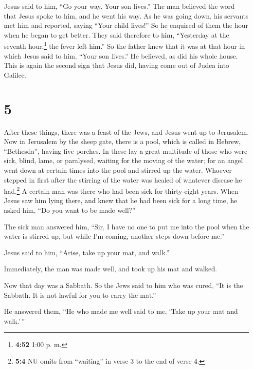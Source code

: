  Jesus said to him, ``Go your way. Your son lives.'' The
man believed the word that Jesus spoke to him, and he went his way.
 As he was going down, his servants met him and reported,
saying ``Your child lives!''  So he enquired of them the
hour when he began to get better. They said therefore to him,
``Yesterday at the seventh hour,\footnote{\textbf{4:52} 1:00 p. m.} the
fever left him.''  So the father knew that it was at that
hour in which Jesus said to him, ``Your son lives.'' He believed, as did
his whole house.  This is again the second sign that
Jesus did, having come out of Judea into Galilee.

\hypertarget{section-4}{%
\section{5}\label{section-4}}

 After these things, there was a feast of the Jews, and
Jesus went up to Jerusalem.  Now in Jerusalem by the sheep
gate, there is a pool, which is called in Hebrew, ``Bethesda'', having
five porches.  In these lay a great multitude of those who
were sick, blind, lame, or paralysed, waiting for the moving of the
water;  for an angel went down at certain times into the
pool and stirred up the water. Whoever stepped in first after the
stirring of the water was healed of whatever disease he had.\footnote{\textbf{5:4}
  NU omits from ``waiting'' in verse 3 to the end of verse 4.}
 A certain man was there who had been sick for
thirty-eight years.  When Jesus saw him lying there, and
knew that he had been sick for a long time, he asked him, ``Do you want
to be made well?''

 The sick man answered him, ``Sir, I have no one to put me
into the pool when the water is stirred up, but while I'm coming,
another steps down before me.''

 Jesus said to him, ``Arise, take up your mat, and walk.''

 Immediately, the man was made well, and took up his mat
and walked.

Now that day was a Sabbath.  So the Jews said to him who
was cured, ``It is the Sabbath. It is not lawful for you to carry the
mat.''

 He answered them, ``He who made me well said to me,
`Take up your mat and walk.'\,''

